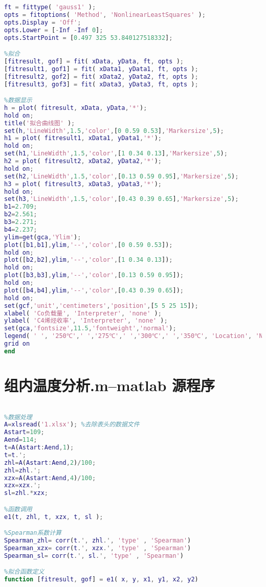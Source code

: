 \documentclass[withoutpreface,bwprint]{cumcmthesis} %
\begin{document}
\begin{appendices}
\begin{lstlisting}[language=matlab]
%高斯拟合设置
ft = fittype( 'gauss1' );
opts = fitoptions( 'Method', 'NonlinearLeastSquares' );
opts.Display = 'Off';
opts.Lower = [-Inf -Inf 0];
opts.StartPoint = [0.497 325 53.840127518332];

%拟合
[fitresult, gof] = fit( xData, yData, ft, opts );
[fitresult1, gof1] = fit( xData1, yData1, ft, opts );
[fitresult2, gof2] = fit( xData2, yData2, ft, opts );
[fitresult3, gof3] = fit( xData3, yData3, ft, opts );

%数据显示
h = plot( fitresult, xData, yData,'*');
hold on;
title('拟合曲线图' );
set(h,'LineWidth',1.5,'color',[0 0.59 0.53],'Markersize',5);
h1 = plot( fitresult1, xData1, yData1,'*');
hold on;
set(h1,'LineWidth',1.5,'color',[1 0.34 0.13],'Markersize',5);
h2 = plot( fitresult2, xData2, yData2,'*');
hold on;
set(h2,'LineWidth',1.5,'color',[0.13 0.59 0.95],'Markersize',5);
h3 = plot( fitresult3, xData3, yData3,'*');
hold on;
set(h3,'LineWidth',1.5,'color',[0.43 0.39 0.65],'Markersize',5);
b1=2.709;
b2=2.561;
b3=2.271;
b4=2.237;
ylim=get(gca,'Ylim');
plot([b1,b1],ylim,'--','color',[0 0.59 0.53]); 
hold on;
plot([b2,b2],ylim,'--','color',[1 0.34 0.13]); 
hold on;
plot([b3,b3],ylim,'--','color',[0.13 0.59 0.95]); 
hold on;
plot([b4,b4],ylim,'--','color',[0.43 0.39 0.65]); 
hold on;
set(gcf,'unit','centimeters','position',[5 5 25 15]);
xlabel( 'Co负载量', 'Interpreter', 'none' );
ylabel( 'C4烯烃收率', 'Interpreter', 'none' );
set(gca,'fontsize',11.5,'fontweight','normal');
legend( ' ', '250℃',' ','275℃',' ','300℃',' ','350℃', 'Location', 'NorthWest', 'Interpreter', 'none' );
grid on
end
 \end{lstlisting}

\section{组内温度分析.m--matlab 源程序}
\begin{lstlisting}[language=matlab]
%组内温度分析

%数据处理
A=xlsread('1.xlsx'); %去除表头的数据文件
Astart=109;
Aend=114;
t=A(Astart:Aend,1);
t=t.';
zhl=A(Astart:Aend,2)/100;
zhl=zhl.';
xzx=A(Astart:Aend,4)/100;
xzx=xzx.';
sl=zhl.*xzx;

%函数调用
e1(t, zhl, t, xzx, t, sl );

%Spearman系数计算
Spearman_zhl= corr(t.', zhl.', 'type' , 'Spearman')
Spearman_xzx= corr(t.', xzx.', 'type' , 'Spearman')
Spearman_sl= corr(t.', sl.', 'type' , 'Spearman')

%拟合函数定义
function [fitresult, gof] = e1( x, y, x1, y1, x2, y2) 


\end{lstlisting}
\end{appendices}
\end{document}
